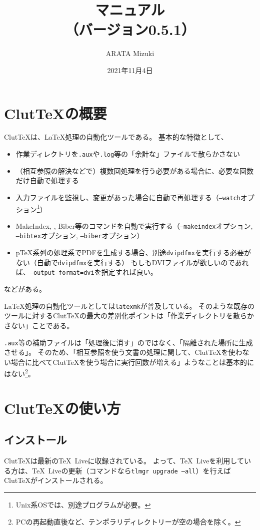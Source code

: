 \documentclass[a4paper]{ltjsreport}
\title{\ClutTeX{}マニュアル\\（バージョン0.5.1）}
\author{ARATA Mizuki}
\date{2021年11月4日}
\newcommand\ClutTeX{Clut\TeX}
\begin{document}
\maketitle
\tableofcontents

\chapter{\ClutTeX{}の概要}
\ClutTeX{}は、\LaTeX{}処理の自動化ツールである。
基本的な特徴として、
\begin{itemize}
\item 作業ディレクトリを\texttt{.aux}や\texttt{.log}等の「余計な」ファイルで散らかさない
\item （相互参照の解決などで）複数回処理を行う必要がある場合に、必要な回数だけ自動で処理する
\item 入力ファイルを監視し、変更があった場合に自動で再処理する（\texttt{--watch}オプション\footnote{Unix系OSでは、別途プログラムが必要。}）
\item MakeIndex, \BibTeX, Biber等のコマンドを自動で実行する（\texttt{--makeindex}オプション, \texttt{--bibtex}オプション, \texttt{--biber}オプション）
\item p\TeX 系列の処理系でPDFを生成する場合、別途\texttt{dvipdfmx}を実行する必要がない（自動で\texttt{dvipdfmx}を実行する）
  もしもDVIファイルが欲しいのであれば、\texttt{--output-format=dvi}を指定すれば良い。
\end{itemize}
などがある。

\LaTeX{}処理の自動化ツールとしては\texttt{latexmk}が普及している。
そのような既存のツールに対する\ClutTeX{}の最大の差別化ポイントは「作業ディレクトリを散らかさない」ことである。

\texttt{.aux}等の補助ファイルは「処理後に消す」のではなく、「隔離された場所に生成させる」。
そのため、「相互参照を使う文書の処理に関して、\ClutTeX{}を使わない場合に比べて\ClutTeX{}を使う場合に実行回数が増える」ようなことは基本的にはない\footnote{PCの再起動直後など、テンポラリディレクトリーが空の場合を除く。}。

\chapter{\ClutTeX{}の使い方}
\section{インストール}
\ClutTeX{}は最新の\TeX\ Liveに収録されている。
よって、\TeX\ Liveを利用している方は、\TeX\ Liveの更新（コマンドなら\texttt{tlmgr upgrade --all}）を行えば\ClutTeX{}がインストールされる。
\end{document}
